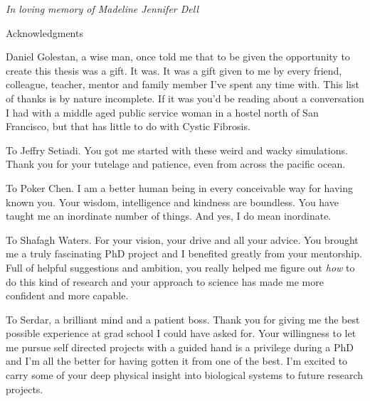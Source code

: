\newpage


\thispagestyle{empty}


\begin{center}
	\vspace*{\fill}
\textit {In loving memory of Madeline Jennifer Dell} \\
	\vspace*{\fill}
\end{center}

\clearpage

\begin{center}
\begin{Large}
\begin{bfseries}
Acknowledgments
\end{bfseries}
\end{Large}
\end{center}
 Daniel Golestan, a wise man, once told me that to be given the opportunity to create this thesis was a gift. It was. It was a gift given to me by every friend, colleague, teacher, mentor and family member I've spent any time with. This list of thanks is by nature incomplete. If it was you'd be reading about a conversation I had with a middle aged public service woman in a hostel north of San Francisco, but that has little to do with Cystic Fibrosis. 

To Jeffry Setiadi. You got me started with these weird and wacky simulations. Thank you for your tutelage and patience, even from across the pacific ocean.

To Poker Chen. I am a better human being in every conceivable way for having known you. Your wisdom, intelligence and kindness are boundless. You have taught me an inordinate number of things. And yes, I do mean inordinate.

To Shafagh Waters. For your vision, your drive and all your advice. You brought me a truly fascinating PhD project and I benefited greatly from your mentorship. Full of helpful suggestions and ambition, you really helped me figure out \textit{how} to do this kind of research and your approach to science has made me more confident and more capable.

To Serdar, a brilliant mind and a patient boss. Thank you for giving me the best possible experience at grad school I could have asked for. Your willingness to let me pursue self directed projects with a guided hand is a privilege during a PhD and I'm all the better for having gotten it from one of the best. I'm excited to carry some of your deep physical insight into biological systems to future research projects. 

